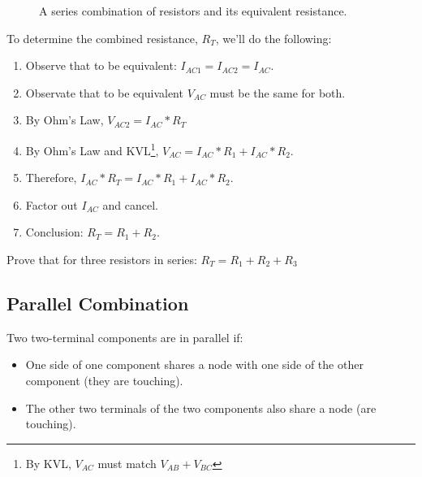 \begin{figure}[H]
\begin{center}
\caption{A series combination of resistors and its equivalent resistance.}
\label{F:2SER}
\end{center}
\end{figure}

To determine the combined resistance, $R_T$, we'll do the following:
\begin{enumerate}
\item Observe that to be equivalent: $I_{AC1}=I_{AC2}=I_{AC}$.
\item Observate that to be equivalent $V_{AC}$ must be the same for both.
\item By Ohm's Law, $V_{AC2}=I_{AC}*R_T$
\item By Ohm's Law and KVL\footnote{By KVL, $V_{AC}$ must match $V_{AB}+V_{BC}$}, $V_{AC}=I_{AC}*R_1+I_{AC}*R_2$.
\item Therefore, $I_{AC}*R_T=I_{AC}*R_1+I_{AC}*R_2$.
\item Factor out $I_{AC}$ and cancel. 
\item Conclusion: $R_T=R_1+R_2$.
\end{enumerate}

\begin{clevel}
Prove that for three resistors in series: $R_T=R_1+R_2+R_3$
\end{clevel}

\subsection{Parallel Combination}
Two two-terminal components are in parallel if:
\begin{itemize}
\item One side of one component shares a node with one side of the other component (they are touching).
\item The other two terminals of the two components also share a node (are touching).
\end{itemize}

